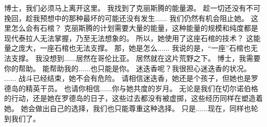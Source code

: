 \documentclass[openany]{book}
\begin{document}
\begin{dialogue}
     博士，我们必须马上离开这里。
     我找到了克丽斯腾的能量源。
     趁一切还没有不可挽回，趁我预想中的那种最坏的可能还没有发生......
     我们仍然有机会阻止她。
     这里怎么会有石棺？
     克丽斯腾的计划需要大量的能量，这种能量的规模和纯度都是现代泰拉人无法掌握，乃至无法想象的。
     所以，她使用了这座石棺的技术？
     这能量之庞大，一座石棺也无法支撑。
     那，她是怎么......
     我说的是，“一座”石棺也无法支撑。
     我没想到......居然在哥伦比亚。
     居然就在这片荒野之下。
     博士，我需要你的帮助。
     能帮助我的......也只能是你。
     迷迭香呢？我很担心迷迭香的状况。
     ......
     战斗已经结束，她不会有危险。
     请相信迷迭香，她还是个孩子，但她也是罗德岛的精英干员。
     也请你相信......你与她共度的岁月。
     无论是我们在切尔诺伯格的行动，还是她在罗德岛的日子，这些过去都没有被虚掷，这些经历同样在塑造着她。
     她会做出自己的选择，我们也只能尊重这种选择。
     只是......现在，同样也轮到我们了。
\end{dialogue}
\end{document}
